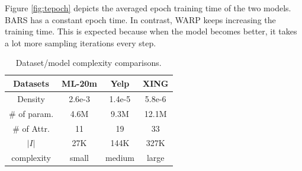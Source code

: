 \documentclass[letterpaper]{article}
\newcommand{\xing}{\textsf{XING}}
\newcommand{\yelp}{\textsf{Yelp}}
\newcommand{\movietwenty}{\textsf{ML-20m}}
\begin{document}
Figure \ref{fig:tepoch} depicts the averaged epoch training time of the two models. BARS has a constant epoch time. In contrast, WARP keeps increasing the training time. This is expected because when the model becomes better, it takes a lot more sampling iterations every step.

\begin{table}[t]
\centering
\begin{adjustbox}{width=0.03\columnwidth}
\begin{tabular}{|c||c|c|c|} \hline
\textbf{Datasets} & \movietwenty & \yelp & \xing \\ \hline
 Density & 2.6e-3 & 1.4e-5 & 5.8e-6 \\ \hline
 \# of param. & 4.6M & 9.3M & 12.1M \\ \hline
 \# of Attr.      & 11     & 19     & 33 \\ \hline
$\left| I \right|$  & 27K &144K & 327K \\ \hline \hline
complexity    & small & medium & large \\ \hline
\end{tabular}
\end{adjustbox}
\caption{Dataset/model complexity comparisons.}
\label{t:time}
\end{table}
\end{document}
